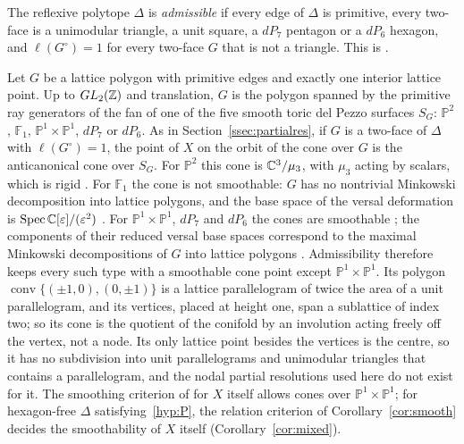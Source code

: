 \begin{definition}\label{def:admissible}
The reflexive polytope $\Delta$ is \emph{admissible} if every edge of $\Delta$ is primitive, every two-face is a unimodular
triangle, a unit square, a $dP_7$ pentagon or a $dP_6$ hexagon, and $\ell(G^\circ)=1$ for every two-face $G$ that is not a
triangle. This is \cite[Def.~8.1]{Paper4}.
\end{definition}

\begin{remark}\label{rem:onepoint}
Let $G$ be a lattice polygon with primitive edges and exactly one
interior lattice point. Up to $GL_2(\mathbb Z)$ and translation, $G$ is the polygon spanned by the primitive ray generators
of the fan of one of the five smooth toric del Pezzo surfaces $S_G$: $\mathbb P^2$, $\mathbb F_1$,
$\mathbb P^1\times\mathbb P^1$, $dP_7$ or $dP_6$. As in Section~\ref{ssec:partialres}, if $G$ is a two-face of $\Delta$
with $\ell(G^\circ)=1$, the point of $X$ on the orbit of the cone over $G$ is the anticanonical cone over $S_G$. For
$\mathbb P^2$ this cone is $\mathbb C^3/\mu_3$, with $\mu_3$ acting by scalars, which is rigid \cite{Schlessinger}. For
$\mathbb F_1$ the cone is not smoothable: $G$ has no nontrivial Minkowski decomposition into lattice polygons, and the
base space of the versal deformation is $\operatorname{Spec}\mathbb C[\varepsilon]/(\varepsilon^2)$
\cite[(9.1)(iv), (9.2)]{Altmann97}. For $\mathbb P^1\times\mathbb P^1$, $dP_7$ and $dP_6$ the cones are smoothable
\cite[Table~1, Lemma~3.5]{Paper5}; the components of their reduced versal base spaces correspond to the maximal
Minkowski decompositions of $G$ into lattice polygons \cite[(2.5), (8.1)]{Altmann97}. Admissibility therefore keeps
every such type with a smoothable cone point except $\mathbb P^1\times\mathbb P^1$. Its polygon
$\operatorname{conv}\{(\pm1,0),(0,\pm1)\}$ is a lattice parallelogram of twice the area of a unit parallelogram, and
its vertices, placed at height one, span a sublattice of index two; so its cone is the quotient of the conifold by
an involution acting freely off the vertex, not a node. Its only lattice point besides the vertices is the centre,
so it has no subdivision into unit parallelograms and unimodular triangles that contains a parallelogram, and the
nodal partial resolutions used here do not exist for it. The smoothing criterion of \cite[Thm.~4.7]{Paper5} for $X$
itself allows cones over $\mathbb P^1\times\mathbb P^1$; for hexagon-free $\Delta$ satisfying~\ref{hyp:P}, the
relation criterion of Corollary~\ref{cor:smooth} decides the smoothability of $X$ itself (Corollary~\ref{cor:mixed}).
\end{remark}


